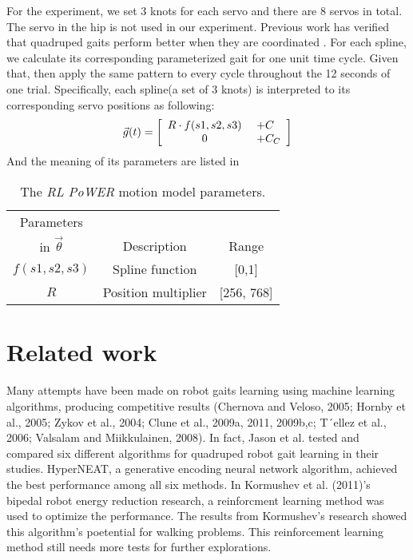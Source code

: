 For the experiment, we set 3 knots for each servo and there are 8
servos in total. The servo in the hip is not used in
our experiment. Previous work has verified that quadruped gaits
perform better when they are coordinated \cite{clune2009evolving-coordinated-quadruped} \cite{clune2011on-the-performance-of-indirect-encoding}
\cite{valsalam2008modular-neuroevolution-for-multilegged}. For each spline, we calculate its corresponding parameterized gait for one unit time cycle. Given that, then apply the same
pattern to every cycle throughout the 12 seconds of one
trial. Specifically, each spline(a set of 3 knots) is interpreted to its corresponding servo positions as
following:
\[
\vec{g}(t) =
\left[ {\begin{array}{c@{ }c@{ }c@{ }l@{ }l}
R \cdot f(s1, s2, s3) & \ \          & \             & \            & + C \\ %
0                              & \             & \             & \            & + C_C \\ %
\end{array} } \right]
\]
And the meaning of its parameters are listed in 
\begin{table}[b]
\begin{center}
\begin{tabular}{|c|c|c|}
\hline
Parameters        &                           &       \\
in $\vec{\theta}$ & Description               & Range \\
\hline
\hline
$f(s1,s2,s3)$        & Spline function           & [0,1] \\  %
\hline
$R$          & Position multiplier                & [256, 768] \\
\hline
\end{tabular}
\caption{The \emph{RL PoWER} motion model parameters.}
\label{tab:params}
\end{center}
\end{table}




\section{Related work}
Many attempts have been made on robot gaits learning using machine learning algorithms, producing competitive results (Chernova and Veloso, 2005; Hornby et al., 2005; Zykov et al., 2004; Clune et al., 2009a, 2011, 2009b,c; T´ellez et al., 2006; Valsalam and Miikkulainen, 2008). In fact, Jason et al. tested and compared six different algorithms for quadruped robot gait learning in their studies. HyperNEAT, a generative encoding neural network algorithm, achieved the best performance among all six methods. In Kormushev et al. (2011)'s bipedal robot energy reduction research, a reinforcment learning method was used to optimize the performance. The results from Kormushev's research showed this algorithm's poetential for walking problems. This reinforcement learning method still needs more tests for further explorations.


